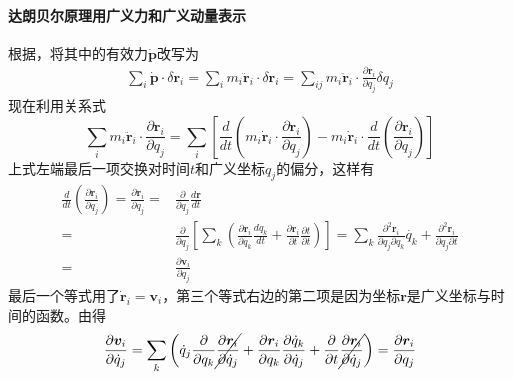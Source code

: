 \paragraph*{达朗贝尔原理用广义力和广义动量表示}
根据，将其中的有效力$\dot{\bm{p}}$改写为
\begin{equation*}
	\begin{aligned}
		\sum_{i} \dot{\bm{p}}\cdot \delta\bm{r}_i = \sum_{i} m_i \ddot{\bm{r}}_i \cdot\delta\bm{r}_i = \sum_{ij} m_i \ddot{\bm{r}}_i \cdot\frac{\partial \bm{r}_i}{\partial q_j}\delta q_j
	\end{aligned}
\end{equation*}
现在利用关系式
\begin{equation}
	\sum_{i} m_i \ddot{\bm{r}}_i\cdot\frac{\partial\bm{r}_i}{\partial q_j}
	=\sum_{i}\left[\frac{d}{dt}\left(m_i\dot{\bm{r}}_i\cdot\frac{\partial\bm{r}_i}{\partial q_j}\right) - m_i\dot{\bm{r}}_i\cdot\frac{d}{dt}\left(\frac{\partial\bm{r}_i}{\partial q_j}\right)\right]
	\label{eq:math-exp}
\end{equation}
上式左端最后一项交换对时间$t$和广义坐标$q_j$的偏分，这样有
\begin{equation}
	\begin{aligned}
	\frac{d}{dt}\left(\frac{\partial\bm{r}_i}{\partial q_j}\right)
	=\frac{\partial\dot{\bm{r}}_i}{\partial q_j}
	=&\frac{\partial}{\partial q_j} \frac{d\bm{r}}{dt} \\
	=&\frac{\partial}{\partial q_j} 
	      \left[\sum_{k}\left(\frac{\partial\bm{r}_i}{\partial q_k}\frac{d q_{k}}{dt} + \frac{\partial \bm{r}_i}{\partial t}\frac{\partial t}{\partial t}\right)\right]
	=\sum_{k}\frac{\partial^2\bm{r}_i}{\partial q_j\partial q_k}\dot{q_k} + \frac{\partial^2 \bm{r}_i}{\partial q_j \partial t}	 \\
	=&\frac{\partial \bm{v}_i}{\partial q_j}
\end{aligned}
\end{equation}
最后一个等式用了$\dot{\bm{r}}_i = \bm{v}_i$，第三个等式右边的第二项是因为坐标$\bm{r}$是广义坐标与时间的函数。由得
\begin{equation}
	\frac{\partial \bm{v}_i}{\partial \dot{q}_j} 
	= \sum_{k}\left(\dot{q}_j\frac{\partial}{\partial q_k}\cancel{\frac{\partial \bm{r}_i}{\partial \dot{q}_j}} + \frac{\partial \bm{r}_i}{\partial q_k}\frac{\partial \dot{q}_k}{\partial \dot{q}_j} + \frac{\partial}{\partial t}\cancel{\frac{\partial \bm{r}_i}{\partial \dot{q}_j}}\right)
	= \frac{\partial \bm{r}_i}{\partial q_j}
\end{equation}
